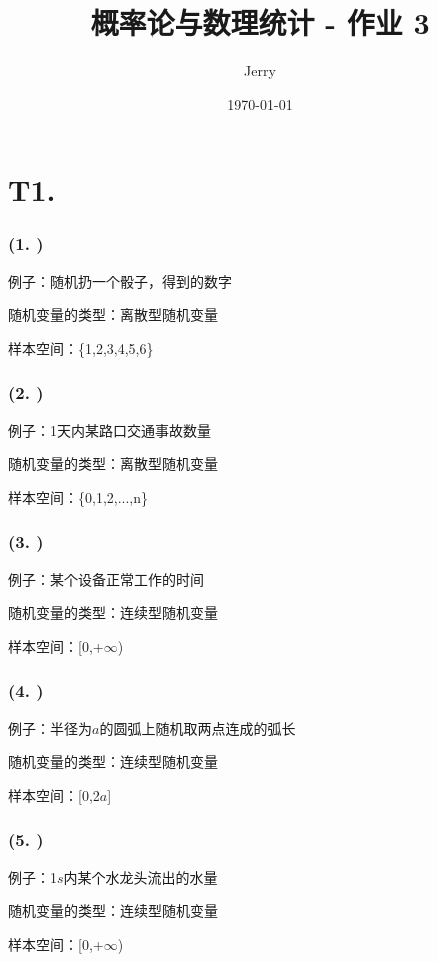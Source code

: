 \documentclass{article}
\title{\bf\huge 概率论与数理统计 - 作业 3}
\author{Jerry}
\date{\today}
\begin{document}
\maketitle

\section*{T1. }

\subsubsection*{(1. )}

例子：随机扔一个骰子，得到的数字

随机变量的类型：离散型随机变量

样本空间：\{1,2,3,4,5,6\}

\subsubsection*{(2. )}

例子：1天内某路口交通事故数量

随机变量的类型：离散型随机变量

样本空间：\{0,1,2,...,n\}

\subsubsection*{(3. )}

例子：某个设备正常工作的时间

随机变量的类型：连续型随机变量

样本空间：[0,+$\infty$)

\subsubsection*{(4. )}

例子：半径为$a$的圆弧上随机取两点连成的弧长

随机变量的类型：连续型随机变量

样本空间：[0,2$a$]

\subsubsection*{(5. )}

例子：1$s$内某个水龙头流出的水量

随机变量的类型：连续型随机变量

样本空间：[0,+$\infty$)
\end{document}
